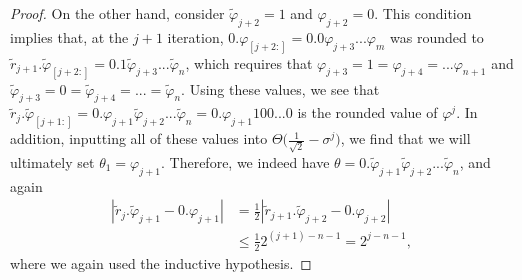 \documentclass[aps,pra,showpacs,notitlepage,twocolumn,superscriptaddress,nofootinbib]{revtex4-1}
\begin{document}
\begin{proof}
On the other hand, consider $\tilde{\varphi}_{j+2} = 1$ and $\varphi_{j+2} = 0$. This condition implies that, at the $j+1$ iteration, $0.\varphi_{[j+2:]} = 0.0\varphi_{j+3} ... \varphi_m$ was rounded to $\tilde{r}_{j+1}.\tilde{\varphi}_{[j+2:]} = 0.1\tilde{\varphi}_{j+3} ... \tilde{\varphi}_{n} $, which requires that $\varphi_{j+3} = 1 = \varphi_{j+4} = ... \varphi_{n+1}$ and $\tilde{\varphi}_{j+3} = 0 = \tilde{\varphi}_{j+4} = ... = \tilde{\varphi}_{n}$. Using these values, we see that $\tilde{r}_j.\tilde{\varphi}_{[j+1:]} = 0.\varphi_{j+1}\tilde{\varphi}_{j+2} ... \tilde{\varphi}_n = 0.\varphi_{j+1} 100...0$ is the rounded value of $\varphi^j$. In addition, inputting all of these values into $\Theta\big(\frac{1}{\sqrt{2}} - \sigma^j \big)$, we find that we will ultimately set $\theta_1 = \varphi_{j+1}$. Therefore, we indeed have $\theta = 0.\tilde{\varphi}_{j+1} \tilde{\varphi}_{j+2} ... \tilde{\varphi}_{n}$, and again 
\begin{equation}
\begin{split}
    |\tilde{r}_j . \tilde{\varphi}_{j+1} - 0.\varphi_{j+1}| &= \frac{1}{2}|\tilde{r}_{j+1}.\tilde{\varphi}_{j+2} - 0.\varphi_{j+2}| \\ &\leq \frac{1}{2}2^{(j+1)-n-1} = 2^{j-n-1},
\end{split}
\end{equation}
where we again used the inductive hypothesis. 



\end{proof}
\end{document}
